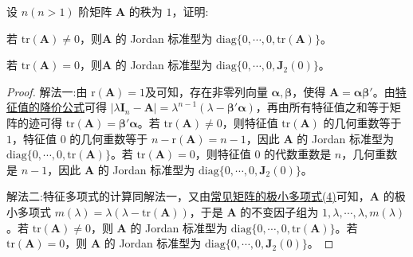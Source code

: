 \documentclass[../../main.tex]{subfiles}%
\begin{document}
\begin{proposition}[秩一阵的Jordan标准型]\label{proposition:秩一阵的Jordan标准型}
设 \(n(n > 1)\) 阶矩阵 \(\boldsymbol{A}\) 的秩为 \(1\)，证明: 

若 \(\mathrm{tr}(\boldsymbol{A}) \ne 0\)，则\(\boldsymbol{A}\) 的 Jordan 标准型为 \(\mathrm{diag}\{0, \cdots, 0, \mathrm{tr}(\boldsymbol{A})\}\)。

若 \(\mathrm{tr}(\boldsymbol{A}) = 0\)，则\(\boldsymbol{A}\) 的 Jordan 标准型为 \(\mathrm{diag}\{0, \cdots, 0, \boldsymbol{J}_2(0)\}\)。
\end{proposition}
\begin{proof}

{\color{blue}解法一:}由 \(\mathrm{r}(\boldsymbol{A}) = 1\)及可知，存在非零列向量 \(\boldsymbol{\alpha}, \boldsymbol{\beta}\)，使得 \(\boldsymbol{A} = \boldsymbol{\alpha}\boldsymbol{\beta}'\)。由\hyperref[theorem:特征值的降价公式]{特征值的降价公式}可得 \(|\lambda\boldsymbol{I}_n - \boldsymbol{A}| = \lambda^{n - 1}(\lambda - \boldsymbol{\beta}'\boldsymbol{\alpha})\)，再由所有特征值之和等于矩阵的迹可得 \(\mathrm{tr}(\boldsymbol{A}) = \boldsymbol{\beta}'\boldsymbol{\alpha}\)。若 \(\mathrm{tr}(\boldsymbol{A}) \neq 0\)，则特征值 \(\mathrm{tr}(\boldsymbol{A})\) 的几何重数等于 \(1\)，特征值 \(0\) 的几何重数等于 \(n - \mathrm{r}(\boldsymbol{A}) = n - 1\)，因此 \(\boldsymbol{A}\) 的 Jordan 标准型为 \(\mathrm{diag}\{0, \cdots, 0, \mathrm{tr}(\boldsymbol{A})\}\)。若 \(\mathrm{tr}(\boldsymbol{A}) = 0\)，则特征值 \(0\) 的代数重数是 \(n\)，几何重数是 \(n - 1\)，因此 \(\boldsymbol{A}\) 的 Jordan 标准型为 \(\mathrm{diag}\{0, \cdots, 0, \boldsymbol{J}_2(0)\}\)。

{\color{blue}解法二:}特征多项式的计算同解法一，又由\hyperref[proposition:常见矩阵的极小多项式]{常见矩阵的极小多项式(4)}可知，\(\boldsymbol{A}\) 的极小多项式 \(m(\lambda) = \lambda(\lambda - \mathrm{tr}(\boldsymbol{A}))\)，于是 \(\boldsymbol{A}\) 的不变因子组为 \(1, \lambda, \cdots, \lambda, m(\lambda)\)。若 \(\mathrm{tr}(\boldsymbol{A}) \neq 0\)，则 \(\boldsymbol{A}\) 的 Jordan 标准型为 \(\mathrm{diag}\{0, \cdots, 0, \mathrm{tr}(\boldsymbol{A})\}\)。若 \(\mathrm{tr}(\boldsymbol{A}) = 0\)，则 \(\boldsymbol{A}\) 的 Jordan 标准型为 \(\mathrm{diag}\{0, \cdots, 0, \boldsymbol{J}_2(0)\}\)。


\end{proof}
\end{document}
